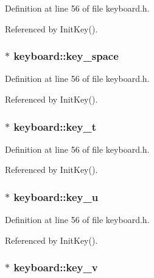 Definition at line 56 of file keyboard.h.

Referenced by Init\-Key().
\subsubsection{ $\ast$ {\bf keyboard::key\_\-space}\hspace{0.3cm}{\tt  [private]}}\label{classkeyboard_keyboardr37}




Definition at line 56 of file keyboard.h.

Referenced by Init\-Key().
\subsubsection{ $\ast$ {\bf keyboard::key\_\-t}\hspace{0.3cm}{\tt  [private]}}\label{classkeyboard_keyboardr19}




Definition at line 56 of file keyboard.h.

Referenced by Init\-Key().
\subsubsection{ $\ast$ {\bf keyboard::key\_\-u}\hspace{0.3cm}{\tt  [private]}}\label{classkeyboard_keyboardr20}




Definition at line 56 of file keyboard.h.

Referenced by Init\-Key().
\subsubsection{ $\ast$ {\bf keyboard::key\_\-v}\hspace{0.3cm}{\tt  [private]}}\label{classkeyboard_keyboardr21}




